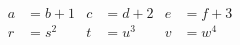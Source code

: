\documentclass[a4paper]{article}
\begin{document}
	\begin{align*}
		a &= b+1   &  c &= d+2  &  e &= f+3   \\
		r &= s^{2} &  t &=u^{3} &  v &= w^{4}
	\end{align*}
\end{document}
